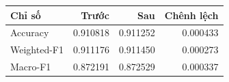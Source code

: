 \begin{tabularx}{\linewidth}{>{\raggedright\arraybackslash}Xrrr}
\toprule
Chỉ số & Trước & Sau & Chênh lệch\\\midrule
Accuracy & 0.910818 & 0.911252 & 0.000433\\
Weighted-F1 & 0.911176 & 0.911450 & 0.000273\\
Macro-F1 & 0.872191 & 0.872529 & 0.000337\\
\bottomrule\end{tabularx}
